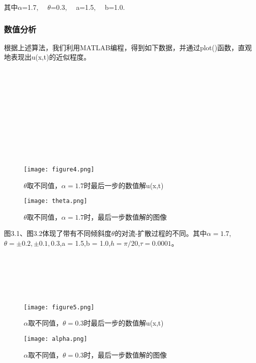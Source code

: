 其中$\alpha$=1.7,$\quad$ $\theta$=0.3,$\quad$ a=1.5,$\quad$ b=1.0.

\subsubsection{数值分析}
根据上述算法，我们利用MATLAB编程，得到如下数据，并通过plot()函数，直观地表现出u(x,t)的近似程度。
\\
\\
\\
\\
\\
\\
\\
\\
\\
\\
\\
\begin{figure*}[ht]	
	\centering
	\texttt{[image: figure4.png]}
	\caption{$\theta$取不同值，$\alpha=1.7$时最后一步的数值解u(x,t)}
	\label{fig:pathdemo4}
\end{figure*}

\begin{figure*}[ht]	
	\centering
	\texttt{[image: theta.png]}
	\caption{$\theta$取不同值，$\alpha=1.7$时，最后一步数值解的图像}
	\label{fig:pathdemo4}
\end{figure*}
图3.1、图3.2体现了带有不同倾斜度$\theta$的对流-扩散过程的不同。其中$\alpha=1.7$,$\theta=\pm 0.2,\pm 0.1,0.3$,a = 1.5,b = 1.0,$h=\pi/20$,$\tau=0.0001$。
\\
\\
\\
\\
\\
\\
\begin{figure*}[ht]	
	\centering
	\texttt{[image: figure5.png]}
	\caption{$\alpha$取不同值，$\theta=0.3$时最后一步的数值解u(x,t)}
	\label{fig:pathdemo4}
\end{figure*}

\begin{figure*}[ht]	
	\centering
	\texttt{[image: alpha.png]}
	\caption{$\alpha$取不同值，$\theta=0.3$时，最后一步数值解的图像}
	\label{fig:pathdemo4}
\end{figure*}

